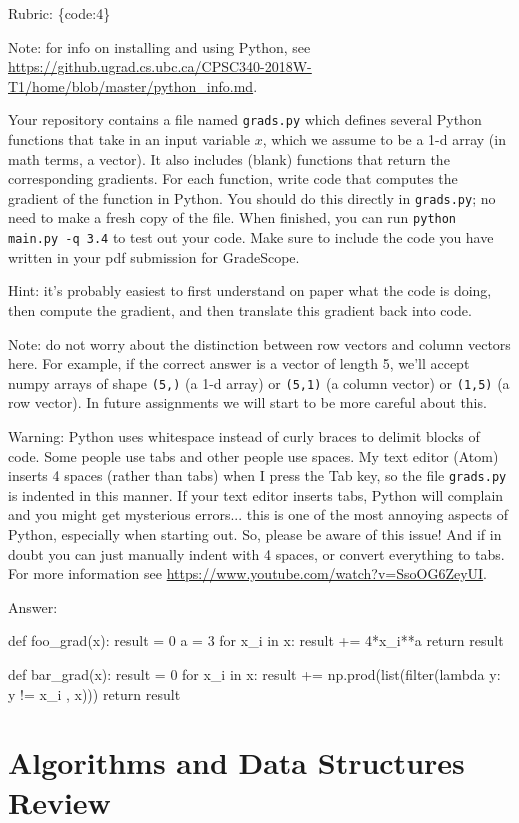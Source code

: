 \documentclass{article}
\def\rubric#1{\gre{Rubric: \{#1\}}}{}
\def\ans#1{\par\gre{Answer: #1}}
\def\blu#1{{\color{blu}#1}}
\def\gre#1{{\color{gre}#1}}
\begin{document}
\rubric{code:4}

Note: for info on installing and using Python, see \\\url{https://github.ugrad.cs.ubc.ca/CPSC340-2018W-T1/home/blob/master/python_info.md}.

Your repository contains a file named \texttt{grads.py} which defines several Python functions that take in an input variable $x$, which we assume to be a 1-d array (in math terms, a vector).
It also includes (blank) functions that return the corresponding gradients.
For each function, \blu{write code that computes the gradient of the function} in Python.
You should do this directly in \texttt{grads.py}; no need to make a fresh copy of the file. When finished, you can run \texttt{python main.py -q 3.4} to test out your code. Make sure to include the code you have written in your pdf submission for GradeScope.

Hint: it's probably easiest to first understand on paper what the code is doing, then compute
the gradient, and then translate this gradient back into code.

Note: do not worry about the distinction between row vectors and column vectors here.
For example, if the correct answer is a vector of length 5, we'll accept numpy arrays
of shape \texttt{(5,)} (a 1-d array) or \texttt{(5,1)} (a column vector) or
\texttt{(1,5)} (a row vector). In future assignments we will start to be more careful
about this.

Warning: Python uses whitespace instead of curly braces to delimit blocks of code.
Some people use tabs and other people use spaces. My text editor (Atom) inserts 4 spaces (rather than tabs) when
I press the Tab key, so the file \texttt{grads.py} is indented in this manner. If your text editor inserts tabs,
Python will complain and you might get mysterious errors... this is one of the most annoying aspects
of Python, especially when starting out. So, please be aware of this issue! And if in doubt you can just manually
indent with 4 spaces, or convert everything to tabs. For more information
see \url{https://www.youtube.com/watch?v=SsoOG6ZeyUI}.
\ans{}
\begin{python}
	def foo_grad(x):
	result = 0
	a = 3 
	for x_i in x:
	result += 4*x_i**a
	return result
	
	
	def bar_grad(x):
	result = 0
	for x_i in x:
	result += np.prod(list(filter(lambda y: y != x_i , x))) 
	return result
\end{python}

\section{Algorithms and Data Structures Review}
\end{document}
